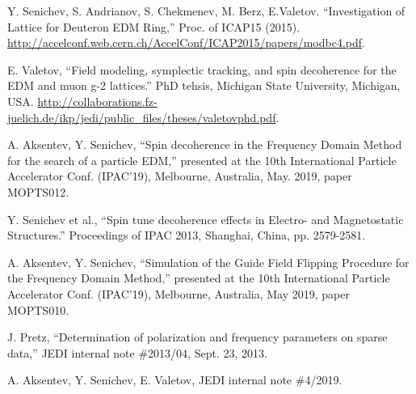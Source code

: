 \documentclass[]{elsarticle}
\begin{document}
\begin{thebibliography}{9}
  Y. Senichev, S. Andrianov, S. Chekmenev, M. Berz, E.Valetov. ``Investigation of Lattice for Deuteron EDM Ring,''
  Proc. of ICAP15 (2015). \url{http://accelconf.web.cern.ch/AccelConf/ICAP2015/papers/modbc4.pdf}.

  E. Valetov, ``Field modeling, symplectic tracking, and spin decoherence for the EDM and muon g-2 lattices.''
  PhD tehsis, Michigan State University, Michigan, USA.
  \url{http://collaborations.fz-juelich.de/ikp/jedi/public_files/theses/valetovphd.pdf}.

  A. Aksentev, Y. Senichev, ``Spin decoherence in the Frequency Domain Method for the search of a particle EDM,''
  presented at the 10th International Particle Accelerator Conf. (IPAC'19), Melbourne, Australia,
  May. 2019, paper MOPTS012.

  Y. Senichev et al., ``Spin tune decoherence effects in Electro- and Magnetostatic Structures.''
  Proceedings of IPAC 2013, Shanghai, China, pp. 2579-2581.

  A. Aksentev, Y. Senichev, ``Simulation of the Guide Field Flipping Procedure for the Frequency Domain Method,'' 
  presented at the 10th International Particle Accelerator Conf. (IPAC'19), Melbourne, Australia,
  May 2019, paper MOPTS010.

  J. Pretz, ``Determination of polarization and frequency parameters on sparse data,'' JEDI internal
  note \#2013/04, Sept. 23, 2013.
  
  A. Aksentev, Y. Senichev, E. Valetov, JEDI internal note \#4/2019.
  
\end{thebibliography}
\end{document}

